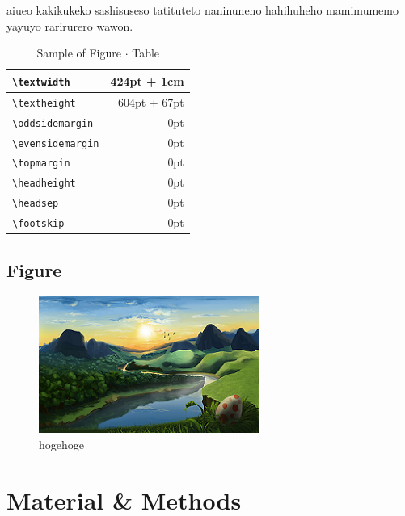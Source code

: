\documentclass[
  ams,
  uplatex]{U-AizuGT}
\begin{document}
    aiueo kakikukeko sashisuseso tatituteto naninuneno hahihuheho mamimumemo
    yayuyo rarirurero wawon.
    
    \begin{table}[htbp]
      \caption{Sample of Figure $\cdot$ Table}\label{tab:fig}
      \begin{center}
        \begin{tabular}{|l|r|}
          \hline
          \verb+\textwidth+ & 424pt + 1cm  \\ \hline
          \verb+\textheight+ & 604pt + 67pt \\ \hline
          \verb+\oddsidemargin+ & 0pt          \\ \hline
          \verb+\evensidemargin+ & 0pt          \\ \hline
          \verb+\topmargin+ & 0pt          \\ \hline
          \verb+\headheight+ & 0pt          \\ \hline
          \verb+\headsep+ & 0pt          \\ \hline
          \verb+\footskip+ & 0pt          \\ \hline
        \end{tabular}
      \end{center}
    \end{table}
    
    \hypertarget{figure}{%
    \subsection{Figure}\label{figure}}
    
    \begin{figure}[htbp]
      \centering
      \includegraphics[scale = 1.0]{image.png}
      \caption{hogehoge}\label{fig:hogehoge}
    \end{figure}
    
    \hypertarget{material-methods}{%
    \section{Material \& Methods}\label{material-methods}}
    
\end{document}
